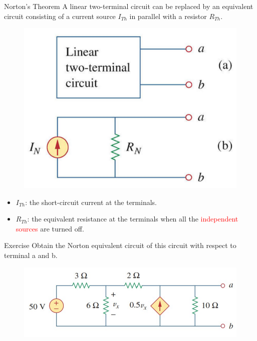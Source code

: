 \documentclass{beamer}
\begin{document}

\begin{frame}{Norton’s Theorem}
A linear two-terminal circuit can be replaced by an equivalent circuit consisting of a current source $I_{Th}$ in parallel with a resistor $R_{Th}$.

\begin{figure}
\centering
\includegraphics[scale=0.3]{img_cir/9.png}
\end{figure}

\begin{itemize}
\item $I_{Th}$: the short-circuit current at the terminals.
\item $R_{Th}$: the equivalent resistance at the terminals when all the \textcolor{red}{independent sources} are turned off.
\end{itemize}
\end{frame}


\begin{frame}{Exercise}
Obtain the Norton equivalent circuit of this circuit with respect to terminal a and b.
\begin{figure}
\centering
\includegraphics[scale=0.5]{img_cir/10.png}
\end{figure}
\end{frame}
\end{document}
